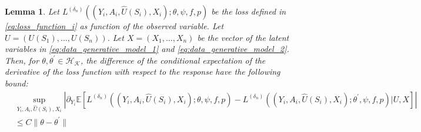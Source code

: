 \documentclass[12pt]{article}
\newtheorem{lemma}{Lemma}%
\newcommand{\E}{\mathbb{E}}
\begin{document}
\begin{lemma}\label{lemma:L_i_derivative_Y_diff}
    Let $L^{(\delta_n)}((Y_i,A_i,\widehat U(S_i),X_i);\theta,\psi,f,p)$ be the loss  defined in \eqref{eq:loss_function_i} as function of the observed variable. Let $U = (U(S_1),\ldots,U(S_n))$. Let $X = (X_1,\ldots,X_n)$ be the vector of the latent variables in \eqref{eq:data_generative_model_1} and \eqref{eq:data_generative_model_2}. Then, for $\theta,\theta^\prime\in \mathcal{H}_{\mathcal{K}}$, the difference of the conditional expectation of the derivative of the loss function with respect to the response have the following bound:
       \begin{align*}
        &\sup_{Y_i,A_i,\widehat U(S_i),X_i}\left|\partial_{Y_i} \E\left[L^{(\delta_n)}((Y_i,A_i,\widehat U(S_i),X_i);\theta,\psi,f,p) - L^{(\delta_n)}((Y_i,A_i,\widehat U(S_i),X_i);\theta^\prime,\psi,f,p)|U,X\right]\right|\\
        & \leq  C\|\theta-\theta^\prime\| 
    \end{align*}
\end{lemma}
\end{document}
